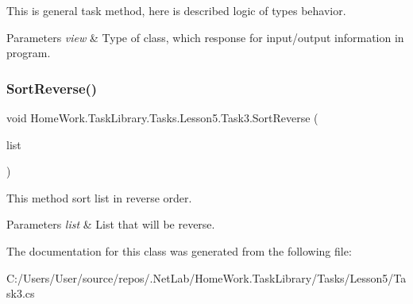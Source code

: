 This is general task method, here is described logic of types behavior. 


\begin{DoxyParams}{Parameters}
{\em view} & Type of class, which response for input/output information in program.\\
\hline
\end{DoxyParams}
\mbox{\label{class_home_work_1_1_task_library_1_1_tasks_1_1_lesson5_1_1_task3_a1be1e63e01ab46baac3ecb8fd24e93bf}} 
\subsubsection{\texorpdfstring{SortReverse()}{SortReverse()}}
{\footnotesize\ttfamily void Home\+Work.\+Task\+Library.\+Tasks.\+Lesson5.\+Task3.\+Sort\+Reverse (\begin{DoxyParamCaption}\item[{List$<$ string $>$}]{list }\end{DoxyParamCaption})\hspace{0.3cm}{\ttfamily [private]}}



This method sort list in reverse order. 


\begin{DoxyParams}{Parameters}
{\em list} & List that will be reverse.\\
\hline
\end{DoxyParams}


The documentation for this class was generated from the following file\+:\begin{DoxyCompactItemize}
\item 
C\+:/\+Users/\+User/source/repos/.\+Net\+Lab/\+Home\+Work.\+Task\+Library/\+Tasks/\+Lesson5/Task3.\+cs\end{DoxyCompactItemize}
